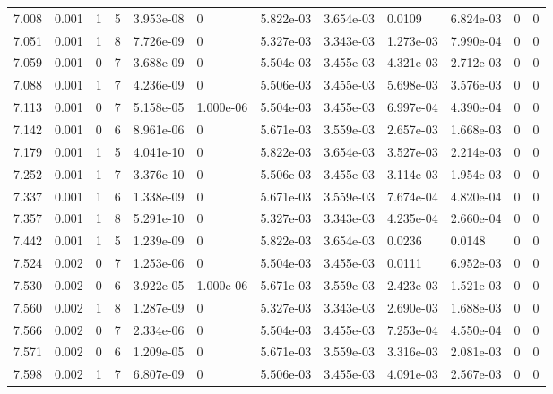 \documentclass[preview]{standalone}
\begin{document}
{{{{{{\begin{tabular}{L{1.2cm}C{1.2cm} C{0.3cm}C{0.5cm} C{1.4cm}C{1.4cm} C{1.4cm}C{1.4cm} C{1.6cm}C{1.6cm} C{1.6cm}C{1.6cm}}
  7.008  &  0.001  & 1     &  5 &  3.953e-08  & 0  &  5.822e-03&   3.654e-03& 0.0109 & 6.824e-03   &  0 & 0  \\ 
  7.051  &  0.001  & 1     &  8 &  7.726e-09  & 0  &  5.327e-03&   3.343e-03& 1.273e-03 & 7.990e-04   &  0 & 0  \\ 
  7.059  &  0.001  & 0     &  7 &  3.688e-09  & 0  &  5.504e-03&   3.455e-03& 4.321e-03 & 2.712e-03   &  0 & 0  \\ 
  7.088  &  0.001  & 1     &  7 &  4.236e-09  & 0  &  5.506e-03&   3.455e-03& 5.698e-03 & 3.576e-03   &  0 & 0  \\ 
  7.113  &  0.001  & 0     &  7 &  5.158e-05  & 1.000e-06  &  5.504e-03&   3.455e-03& 6.997e-04 & 4.390e-04   &  0 & 0  \\ 
  7.142  &  0.001  & 0     &  6 &  8.961e-06  & 0  &  5.671e-03&   3.559e-03& 2.657e-03 & 1.668e-03   &  0 & 0  \\ 
  7.179  &  0.001  & 1     &  5 &  4.041e-10  & 0  &  5.822e-03&   3.654e-03& 3.527e-03 & 2.214e-03   &  0 & 0  \\ 
  7.252  &  0.001  & 1     &  7 &  3.376e-10  & 0  &  5.506e-03&   3.455e-03& 3.114e-03 & 1.954e-03   &  0 & 0  \\ 
  7.337  &  0.001  & 1     &  6 &  1.338e-09  & 0  &  5.671e-03&   3.559e-03& 7.674e-04 & 4.820e-04   &  0 & 0  \\ 
  7.357  &  0.001  & 1     &  8 &  5.291e-10  & 0  &  5.327e-03&   3.343e-03& 4.235e-04 & 2.660e-04   &  0 & 0  \\ 
  7.442  &  0.001  & 1     &  5 &  1.239e-09  & 0  &  5.822e-03&   3.654e-03& 0.0236 & 0.0148   &  0 & 0  \\ 
  7.524  &  0.002  & 0     &  7 &  1.253e-06  & 0  &  5.504e-03&   3.455e-03& 0.0111 & 6.952e-03   &  0 & 0  \\ 
  7.530  &  0.002  & 0     &  6 &  3.922e-05  & 1.000e-06  &  5.671e-03&   3.559e-03& 2.423e-03 & 1.521e-03   &  0 & 0  \\ 
  7.560  &  0.002  & 1     &  8 &  1.287e-09  & 0  &  5.327e-03&   3.343e-03& 2.690e-03 & 1.688e-03   &  0 & 0  \\ 
  7.566  &  0.002  & 0     &  7 &  2.334e-06  & 0  &  5.504e-03&   3.455e-03& 7.253e-04 & 4.550e-04   &  0 & 0  \\ 
  7.571  &  0.002  & 0     &  6 &  1.209e-05  & 0  &  5.671e-03&   3.559e-03& 3.316e-03 & 2.081e-03   &  0 & 0  \\ 
  7.598  &  0.002  & 1     &  7 &  6.807e-09  & 0  &  5.506e-03&   3.455e-03& 4.091e-03 & 2.567e-03   &  0 & 0  \\ 

\end{tabular}}}}}}}
\end{document}
